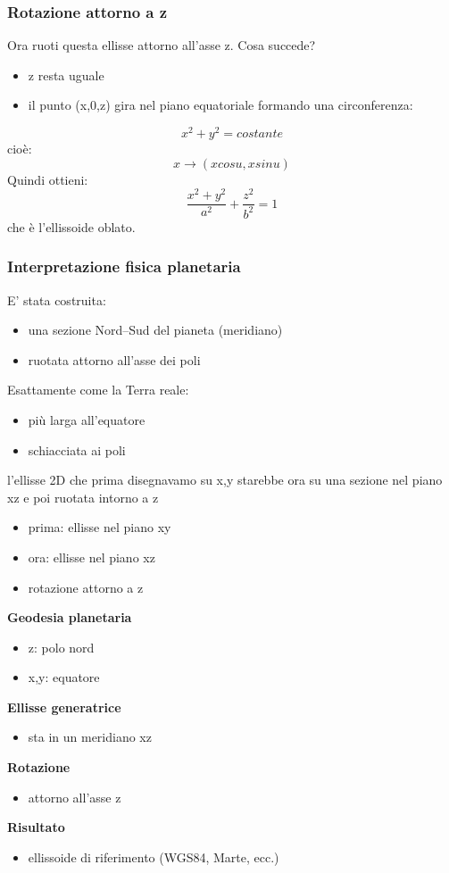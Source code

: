 \documentclass[a4paper,14pt]{article}
\begin{document}
\subsubsection{Rotazione attorno a z}
Ora ruoti questa ellisse attorno all’asse z.
Cosa succede?

\begin{itemize}
\item z resta uguale
\item il punto (x,0,z) gira nel piano equatoriale formando una circonferenza:
\end{itemize}
\[x^2+y^2=costante\]
cioè:
\[x\rightarrow (xcos⁡u,  xsin⁡u)\]
Quindi ottieni:
\[\frac{x^2+y^2}{a^2}+\frac{z^2}{b^2}=1\]
che è l’ellissoide oblato.
\subsubsection{Interpretazione fisica planetaria}
E' stata costruita:
\begin{itemize}
\item una sezione Nord–Sud del pianeta (meridiano)
\item ruotata attorno all’asse dei poli
\end{itemize}
Esattamente come la Terra reale:
\begin{itemize}
\item più larga all’equatore
\item schiacciata ai poli
\end{itemize}
l’ellisse 2D che prima disegnavamo su x,y starebbe ora su una sezione nel piano xz e poi ruotata intorno a z
\begin{itemize}
\item prima: ellisse nel piano xy
\item ora: ellisse nel piano xz
\item rotazione attorno a z
\end{itemize}
\textbf{Geodesia planetaria}\\
\begin{itemize}
\item z: polo nord
\item x,y: equatore
\end{itemize}
\textbf{Ellisse generatrice}\\
\begin{itemize}
\item sta in un meridiano xz
\end{itemize}
\textbf{Rotazione}\\
\begin{itemize}
\item attorno all'asse z
\end{itemize}
\textbf{Risultato}\\
\begin{itemize}
\item ellissoide di riferimento (WGS84, Marte, ecc.)
\end{itemize}
\end{document}
